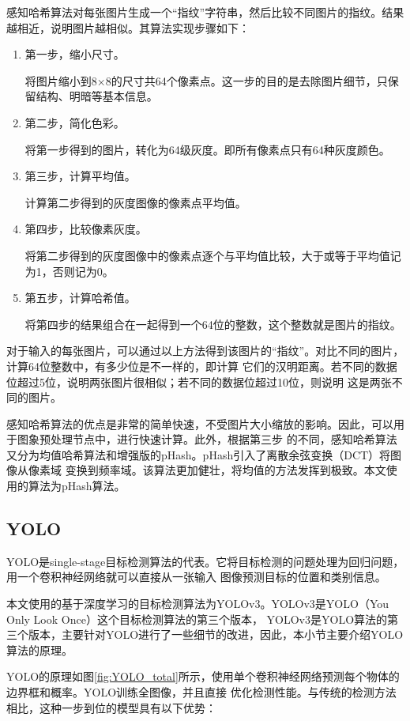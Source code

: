 感知哈希算法对每张图片生成一个“指纹”字符串，然后比较不同图片的指纹。结果越相近，说明图片越相似。其算法实现步骤如下：
\begin{enumerate}
    \item{第一步，缩小尺寸。
    
    将图片缩小到8×8的尺寸共64个像素点。这一步的目的是去除图片细节，只保留结构、明暗等基本信息。}
    \item{第二步，简化色彩。
    
    将第一步得到的图片，转化为64级灰度。即所有像素点只有64种灰度颜色。}
    \item{第三步，计算平均值。
    
    计算第二步得到的灰度图像的像素点平均值。}
    \item{第四步，比较像素灰度。
    
    将第二步得到的灰度图像中的像素点逐个与平均值比较，大于或等于平均值记为1，否则记为0。}
    \item{第五步，计算哈希值。
    
    将第四步的结果组合在一起得到一个64位的整数，这个整数就是图片的指纹。}
\end{enumerate}

对于输入的每张图片，可以通过以上方法得到该图片的“指纹”。对比不同的图片，计算64位整数中，有多少位是不一样的，即计算
它们的汉明距离\cite{hanming_distance}。若不同的数据位超过5位，说明两张图片很相似；若不同的数据位超过10位，则说明
这是两张不同的图片。

感知哈希算法的优点是非常的简单快速，不受图片大小缩放的影响。因此，可以用于图象预处理节点中，进行快速计算。此外，根据第三步
的不同，感知哈希算法又分为均值哈希算法和增强版的pHash\cite{pHash}。pHash引入了离散余弦变换\cite{DCT}（DCT）将图像从像素域
变换到频率域。该算法更加健壮，将均值的方法发挥到极致。本文使用的算法为pHash算法。

\subsection{YOLO}
YOLO是single-stage目标检测算法的代表。它将目标检测的问题处理为回归问题，用一个卷积神经网络就可以直接从一张输入
图像预测目标的位置和类别信息。

本文使用的基于深度学习的目标检测算法为YOLOv3。YOLOv3是YOLO（You Only Look Once）这个目标检测算法的第三个版本，
YOLOv3是YOLO算法的第三个版本，主要针对YOLO进行了一些细节的改进，因此，本小节主要介绍YOLO算法的原理。

YOLO的原理如图\ref{fig:YOLO_total}\cite{YOLO2016}所示，使用单个卷积神经网络预测每个物体的边界框和概率。YOLO训练全图像，并且直接
优化检测性能。与传统的检测方法相比，这种一步到位的模型具有以下优势：

